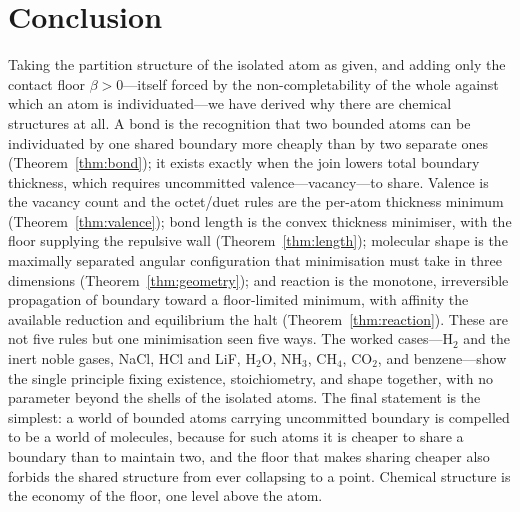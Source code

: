 \documentclass[11pt,twocolumn,a4paper]{article}
\theoremstyle{thmstyle}
\theoremstyle{definition}
\theoremstyle{remark}
\newcommand{\floorc}{\beta}
\begin{document}
\section{Conclusion}
\label{sec:conclusion}

Taking the partition structure of the isolated atom as given, and adding
only the contact floor $\floorc>0$---itself forced by the
non-completability of the whole against which an atom is individuated---we
have derived why there are chemical structures at all. A bond is the
recognition that two bounded atoms can be individuated by one shared
boundary more cheaply than by two separate ones (Theorem~\ref{thm:bond});
it exists exactly when the join lowers total boundary thickness, which
requires uncommitted valence---vacancy---to share. Valence is the vacancy
count and the octet/duet rules are the per-atom thickness minimum
(Theorem~\ref{thm:valence}); bond length is the convex thickness
minimiser, with the floor supplying the repulsive wall
(Theorem~\ref{thm:length}); molecular shape is the maximally separated
angular configuration that minimisation must take in three dimensions
(Theorem~\ref{thm:geometry}); and reaction is the monotone, irreversible
propagation of boundary toward a floor-limited minimum, with affinity the
available reduction and equilibrium the halt (Theorem~\ref{thm:reaction}).
These are not five rules but one minimisation seen five ways. The worked
cases---H$_2$ and the inert noble gases, NaCl, HCl and LiF, H$_2$O, NH$_3$,
CH$_4$, CO$_2$, and benzene---show the single principle fixing existence,
stoichiometry, and shape together, with no parameter beyond the shells of
the isolated atoms. The final statement is the simplest: a world of
bounded atoms carrying uncommitted boundary is compelled to be a world of
molecules, because for such atoms it is cheaper to share a boundary than
to maintain two, and the floor that makes sharing cheaper also forbids the
shared structure from ever collapsing to a point. Chemical structure is
the economy of the floor, one level above the atom.



\end{document}
